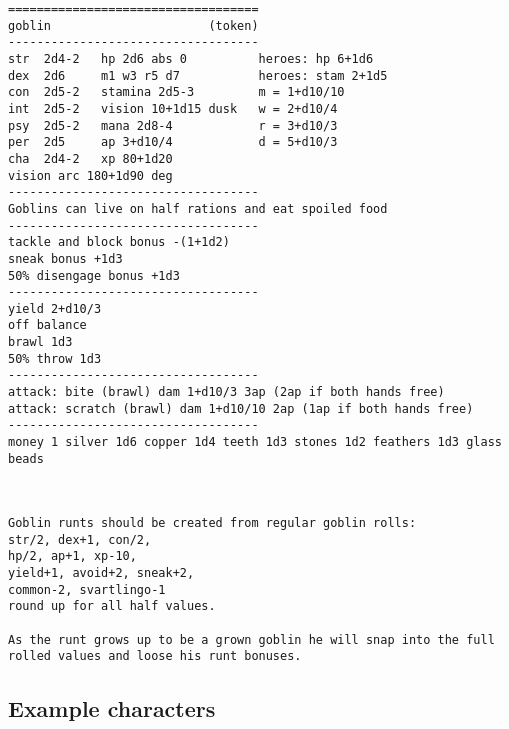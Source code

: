 \goodbreak \begin{samepage} \begin{verbatim}
===================================
goblin                      (token)
-----------------------------------
str  2d4-2   hp 2d6 abs 0          heroes: hp 6+1d6
dex  2d6     m1 w3 r5 d7           heroes: stam 2+1d5
con  2d5-2   stamina 2d5-3         m = 1+d10/10
int  2d5-2   vision 10+1d15 dusk   w = 2+d10/4
psy  2d5-2   mana 2d8-4            r = 3+d10/3
per  2d5     ap 3+d10/4            d = 5+d10/3
cha  2d4-2   xp 80+1d20
vision arc 180+1d90 deg
-----------------------------------
Goblins can live on half rations and eat spoiled food
-----------------------------------
tackle and block bonus -(1+1d2)
sneak bonus +1d3
50% disengage bonus +1d3
-----------------------------------
yield 2+d10/3
off balance
brawl 1d3
50% throw 1d3
-----------------------------------
attack: bite (brawl) dam 1+d10/3 3ap (2ap if both hands free)
attack: scratch (brawl) dam 1+d10/10 2ap (1ap if both hands free)
-----------------------------------
money 1 silver 1d6 copper 1d4 teeth 1d3 stones 1d2 feathers 1d3 glass beads
\end{verbatim} \end{samepage}

\

\goodbreak \begin{samepage} \begin{verbatim}
Goblin runts should be created from regular goblin rolls:
str/2, dex+1, con/2,
hp/2, ap+1, xp-10,
yield+1, avoid+2, sneak+2,
common-2, svartlingo-1
round up for all half values.

As the runt grows up to be a grown goblin he will snap into the full
rolled values and loose his runt bonuses.
\end{verbatim} \end{samepage}

\normalsize






\subsection*{Example characters}

